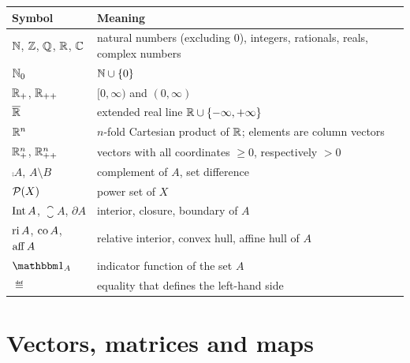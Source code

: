 \begin{center}
	\renewcommand{\arraystretch}{1.25}
	\begin{tabular}{@{}ll@{}}
		\toprule
		Symbol                                       & Meaning                                                        \\
		\midrule
		$\mathbb{N}$, $\mathbb{Z}$, $\mathbb{Q}$, $\mathbb{R}$, $\mathbb{C}$                 & natural numbers (excluding $0$), integers, rationals, reals,
		complex numbers                                                                                               \\
		$\mathbb{N}_0$                                       & $\mathbb{N}\cup\{0\}$                                                  \\
		$\mathbb{R}_+$, $\mathbb{R}_{++}$                            & $[0,\infty)$ and $(0,\infty)$                                  \\
		$\overline{\mathbb{R}}$                              & extended real line $\mathbb{R}\cup\{-\infty,+\infty\}$                 \\
		$\mathbb{R}^n$                                       & $n$-fold Cartesian product of $\mathbb{R}$; elements are column vectors \\
		$\mathbb{R}^n_+$, $\mathbb{R}^n_{++}$                        & vectors with all coordinates $\geq 0$, respectively $>0$        \\
		$\comp{A}$, $A\setminus B$                   & complement of $A$, set difference                              \\
		$\mathcal{P}(X)$                                    & power set of $X$                                               \\
		$\operatorname{Int} A$, $\closure{A}$, $\partial A$        & interior, closure, boundary of $A$                             \\
		$\operatorname{ri} A$, $\operatorname{co} A$, $\operatorname{aff} A$             & relative interior, convex hull, affine hull of $A$             \\
		$\one_A$                                     & indicator function of the set $A$                              \\
		$\eqdef$                                     & equality that defines the left-hand side                       \\
		\bottomrule
	\end{tabular}
\end{center}

\section*{Vectors, matrices and maps}

